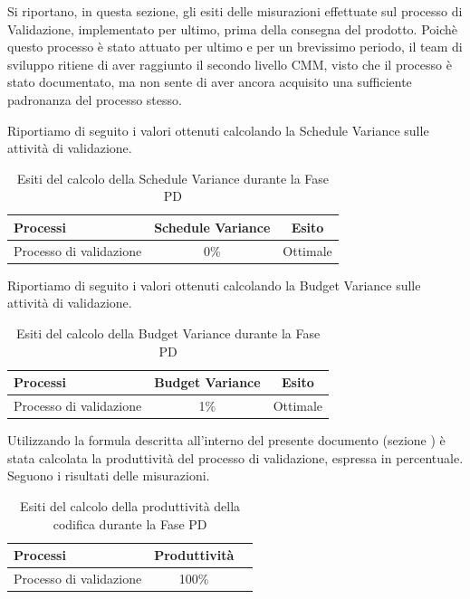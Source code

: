 		Si riportano, in questa sezione, gli esiti delle misurazioni effettuate sul processo di Validazione, implementato per ultimo, prima della consegna del prodotto.
			Poichè questo processo è stato attuato per ultimo e per un brevissimo periodo, il team di sviluppo ritiene di aver raggiunto il secondo livello CMM, visto che il processo è stato documentato, ma non sente di aver ancora acquisito una sufficiente padronanza del processo stesso.
			
			 Riportiamo di seguito i valori ottenuti calcolando la Schedule Variance sulle attività di validazione.
			\begin{table}[H]
				\centering
				\begin{tabu}{| l | c | c |}
					\hline
						Processi 						& Schedule Variance	& Esito		\\ \hline \hline
						Processo di validazione & 0\% & Ottimale \\ \hline
				\end{tabu}
				\caption{Esiti del calcolo della Schedule Variance durante la Fase PD}
			\end{table}	
						
			Riportiamo di seguito i valori ottenuti calcolando la Budget Variance sulle attività di validazione.		\\
			\begin{table}[H]
			\centering
				\begin{tabu}{| l | c | c |}
					\hline
						Processi 						& Budget Variance	& Esito		\\ \hline \hline
						Processo di validazione & 1\% & Ottimale \\ \hline
				\end{tabu}
				\caption{Esiti del calcolo della Budget Variance durante la Fase PD}
			\end{table}	
							
			Utilizzando la formula descritta all'interno del presente documento (sezione ) è stata calcolata la produttività del processo di validazione, espressa in percentuale. \\
			Seguono i risultati delle misurazioni.
			\\ 
			\begin{table}[H]
				\centering
				\begin{tabu}{| l | c | c |}
					\hline
						Processi 						& Produttività		\\ \hline \hline
						Processo di validazione & 100\%   \\ \hline
				\end{tabu}
				\caption{Esiti del calcolo della produttività della codifica durante la Fase PD}
			\end{table}		
					
